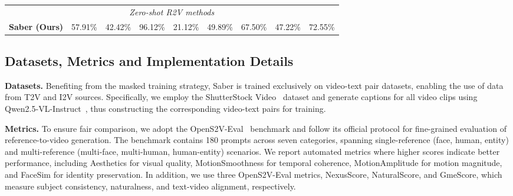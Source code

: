 \begin{table}[!t]
{\begin{tabular}{lcccccccc}
\multicolumn{9}{c}{\cellcolor[HTML]{EFEFEF}\textit{Zero-shot R2V methods}} \\
\textbf{Saber (Ours)}                          & \cellcolor[HTML]{CFE8D9}57.91\%  & 42.42\% & 96.12\% & 21.12\% & 49.89\% & 67.50\% & \cellcolor[HTML]{CFE8D9}47.22\% & 72.55\% \\
\bottomrule[1.5pt]
\end{tabular}
}
\label{saber:tab:opens2v_eval}
\end{table}







\subsection{Datasets, Metrics and Implementation Details}

\noindent \textbf{Datasets.}
Benefiting from the masked training strategy, Saber is trained exclusively on video-text pair datasets, enabling the use of data from T2V and I2V sources.
Specifically, we employ the ShutterStock Video~\citep{sstk} dataset and generate captions for all video clips using Qwen2.5-VL-Instruct~\citep{bai2025qwen2}, thus constructing the corresponding video-text pairs for training.


\noindent \textbf{Metrics.}
To ensure fair comparison, we adopt the OpenS2V-Eval~\citep{yuan2025opens2v} benchmark and follow its official protocol for fine-grained evaluation of reference-to-video generation.
The benchmark contains 180 prompts across seven categories, spanning single-reference (face, human, entity) and multi-reference (multi-face, multi-human, human-entity) scenarios.
We report automated metrics where higher scores indicate better performance, including Aesthetics for visual quality, MotionSmoothness for temporal coherence, MotionAmplitude for motion magnitude, and FaceSim for identity preservation.
In addition, we use three OpenS2V-Eval metrics, NexusScore, NaturalScore, and GmeScore, which measure subject consistency, naturalness, and text-video alignment, respectively.


